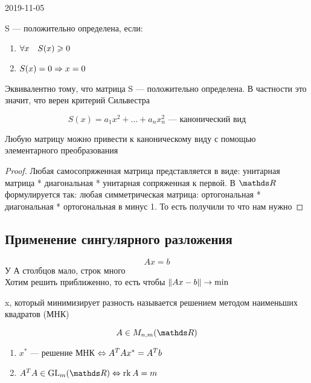 \documentclass[main]{subfiles}
\begin{document}
\begin{lect}{2019-11-05}
    \begin{definition}
      S --- положительно определена, если:
      \begin{enumerate}
        \item $\forall x \quad S(x) \geqslant 0$
        \item $S(x) = 0 \Rightarrow x = 0$
      \end{enumerate}
    \end{definition}

    \begin{remark}
      Эквивалентно тому, что матрица S --- положительно определена. В частности это значит, что верен критерий Сильвестра
    \end{remark}

    \begin{Definition}
      \[S(x) = a_1 x^2 + ... + a_n x_n^2 \text{ --- канонический вид}\]
    \end{Definition}

    \begin{theorem}
      Любую матрицу можно привести к каноническому виду с помощью элементарного преобразования
    \end{theorem}

    \begin{proof}
      Любая самосопряженная матрица представляется в виде: унитарная матрица * диагональная * унитарная сопряженная к первой. В $\R$ формулируется так: любая симметрическая матрица: ортогональная * диагональная * ортогональная в минус 1. То есть получили то что нам нужно
    \end{proof}

    \subsection{Применение сингулярного разложения}
    \[Ax = b\]
    У А столбцов мало, строк много\\
    Хотим решить приближенно, то есть чтобы $\lVert Ax-b \rVert \rightarrow \min$

    \begin{definition}
      x, который минимизирует разность называется решением методом наименьших квадратов (МНК)
    \end{definition}

    \begin{Theorem}
      \[A \in M_{n,m}(\R)\]
      \begin{enumerate}
        \item $x^*$ --- решение МНК $\Leftrightarrow A^T A x^* = A^T b$
        \item $A^T A \in \GL_m(\R) \lra \rk A = m$
      \end{enumerate}
    \end{Theorem}


\end{lect}
\end{document}
